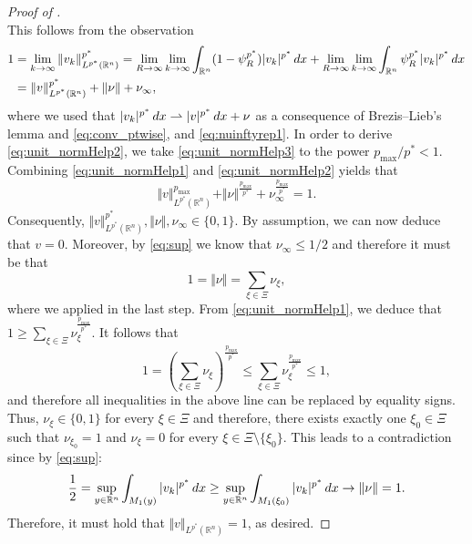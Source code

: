 \documentclass[10pt,a4paper]{amsart}
\newcommand{\R}{\mathbb{R}}
\renewcommand{\d}{\textnormal{d}}
\begin{document}
\begin{proof} [Proof of ]
\begin{equation}
\end{equation}
This follows from the observation
\begin{equation}
\label{eq:unit_normHelp3}
\begin{split}
1 &= \lim_{k \to \infty} \Vert v_k \Vert_{L^{p^{\ast}}(\R^n)}^{p^{\ast}} = \lim_{R \to \infty} \lim_{k \to \infty} \int_{\R^n} (1-\psi_R^{p^{\ast}}) \vert v_k \vert^{p^{\ast}} \, \d x + \lim_{R \to \infty} \lim_{k \to \infty} \int_{\R^n} \psi_R^{p^{\ast}} \vert v_k \vert^{p^{\ast}} \, \d x\\
&=\Vert v \Vert_{L^{p^{\ast}}(\R^n)}^{p^{\ast}} + \Vert \nu \Vert+ \nu_{\infty},
\end{split}
\end{equation}
where we used that $\vert v_k \vert^{p^{\ast}}\, \d x \rightharpoonup \vert v \vert^{p^{\ast}} \, \d x + \nu$ as a consequence of Brezis–Lieb's lemma and \eqref{eq:conv_ptwise}, and \eqref{eq:nuinftyrep1}. In order to derive \eqref{eq:unit_normHelp2}, we take \eqref{eq:unit_normHelp3} to the power $p_{\max}/p^{\ast} < 1$.
Combining \eqref{eq:unit_normHelp1} and \eqref{eq:unit_normHelp2} yields that
\begin{equation*}
\Vert v \Vert_{L^{p^{\ast}}(\R^n)}^{p_{\max}} + \Vert \nu \Vert^{\frac{p_{\max}}{p^{\ast}}} + \nu_{\infty}^{\frac{p_{\max}}{p^{\ast}}} = 1.
\end{equation*}
Consequently, $\Vert v \Vert_{L^{p^{\ast}}(\R^n)}^{p^{\ast}}, \Vert \nu \Vert, \nu_{\infty} \in \{0,1\}$. By assumption, we can now deduce that $v = 0$. Moreover, by \eqref{eq:sup} we know that $\nu_{\infty} \le 1/2$ and therefore it must be that 
\begin{equation*}
1 = \Vert \nu \Vert = \sum_{\xi \in \Xi} \nu_{\xi},
\end{equation*}
where we applied  in the last step.
From \eqref{eq:unit_normHelp1}, we deduce that $1 \ge  \sum_{\xi\in\Xi} \nu_{\xi}^{\frac{p_{\max}}{p^{\ast}}}$. It follows that
\begin{equation*}
1 = \left( \sum_{\xi \in \Xi} \nu_{\xi} \right)^{\frac{p_{\max}}{p^{\ast}}} \le \sum_{\xi \in \Xi} \nu_{\xi}^{\frac{p_{\max}}{p^{\ast}}} \le 1,
\end{equation*}
and therefore all inequalities in the above line can be replaced by equality signs. Thus, $\nu_{\xi} \in \{0,1\}$ for every $\xi \in \Xi$ and therefore, there exists exactly one $\xi_0 \in \Xi$ such that $\nu_{\xi_0} = 1$ and $\nu_{\xi} = 0$ for every $\xi \in \Xi \setminus \{\xi_0\}$. This leads to a contradiction since by \eqref{eq:sup}:
\begin{equation*}
\frac{1}{2} = \sup_{y \in \R^n} \int_{M_1(y)} \vert v_k \vert^{p^{\ast}} \, \d x \ge \sup_{y \in \R^n} \int_{M_1(\xi_0)} \vert v_k \vert^{p^{\ast}} \, \d x \to \Vert \nu \Vert = 1.
\end{equation*}
Therefore, it must hold that $\Vert v \Vert_{L^{p^{\ast}}(\R^n)} = 1$, as desired.
\end{proof}
\end{document}
